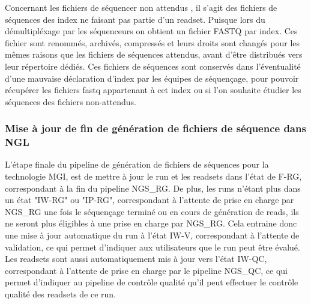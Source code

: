 Concernant les fichiers de séquencer \og non attendus \fg{}, il s'agit des fichiers de séquences des index ne faisant pas partie d'un readset. Puisque lors du démultipléxage par les séquenceurs on obtient un fichier FASTQ par index.
Ces fichier sont renommés, archivés, compressés et leurs droits sont changés pour les mêmes raisons que les fichiers de séquences \og attendus\fg{}, avant d'être distribués vers leur répertoire dédiés.
Ces fichiers de séquences sont conservés dans l'éventualité d'une mauvaise déclaration d'index par les équipes de séquençage, pour pouvoir récupérer les fichiers fastq appartenant à cet index ou si l'on souhaite étudier les séquences des fichiers \og non-attendus\fg{}.\\

\subsubsection*{Mise à jour de fin de génération de fichiers de séquence dans NGL}
L'étape finale du pipeline de génération de fichiers de séquences pour la technologie MGI, est de mettre à jour le run et les readsets dans l'état de \og F-RG\fg{}, correspondant à la fin du pipeline NGS\_RG.
De plus, les runs n'étant plus dans un état "IW-RG" ou "IP-RG", correspondant à l'attente de prise en charge par NGS\_RG une fois le séquençage terminé ou en cours de génération de reads, ils ne seront plus éligibles à une prise en charge par NGS\_RG.
Cela entraine donc une mise à jour automatique du run à l'état \og IW-V\fg{}, correspondant à l'attente de validation, ce qui permet d'indiquer aux utilisateurs que le run peut être évalué.
Les readsets sont aussi automatiquement mis à jour vers l'état \og IW-QC\fg{}, correspondant à l'attente de prise en charge par le pipeline NGS\_QC, ce qui permet d'indiquer au pipeline de contrôle qualité qu'il peut effectuer le contrôle qualité des readsets de ce run.

